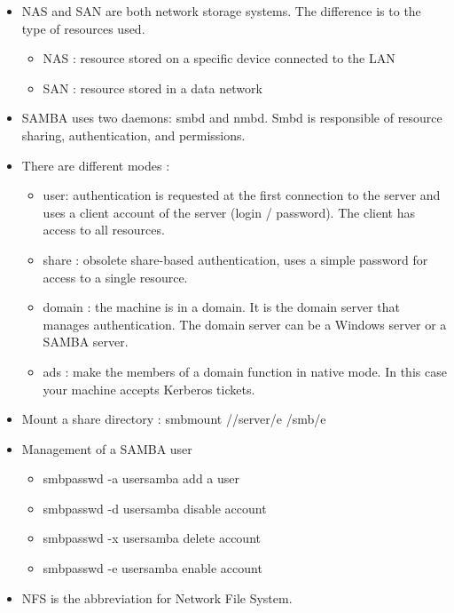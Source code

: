 \documentclass[a4paper]{article}
\begin{document}
\begin{itemize}

\item NAS and SAN are both network storage systems. The difference is to the type of resources used.
\begin{itemize}
    \item NAS : resource stored on a specific device connected to the LAN
    \item SAN : resource stored in a data network
\end{itemize}

\item SAMBA uses two daemons: smbd and nmbd. Smbd is responsible of resource sharing, authentication, and permissions.

\item There are different modes :
\begin{itemize}
    \item user: authentication is requested at the first connection to the server and uses a client account of the server (login / password). The client has access to all resources.
    \item share : obsolete share-based authentication, uses a simple password for access to a single resource.
    \item domain : the machine is in a domain. It is the domain server that manages authentication. The domain server can be a Windows server or a SAMBA server.
    \item ads : make the members of a domain function in native mode. In this case your machine accepts Kerberos tickets.
\end{itemize}

\item Mount a share directory : smbmount //server/e /smb/e

\item Management of a SAMBA user
\begin{itemize}
    \item smbpasswd -a usersamba add a user
    \item smbpasswd -d usersamba disable account
    \item smbpasswd -x usersamba delete account
    \item smbpasswd -e usersamba enable account
\end{itemize}

\item NFS is the abbreviation for Network File System.

\end{itemize}
\end{document}
